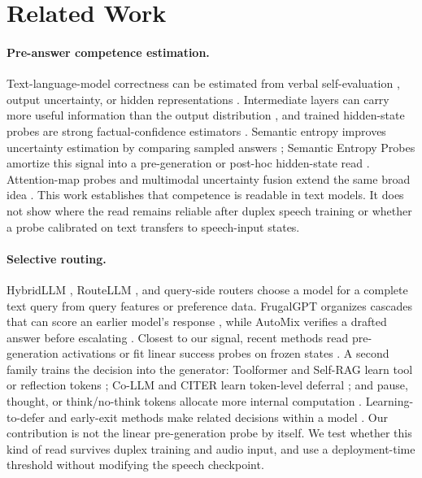 \section{Related Work}
\label{sec:related}

\paragraph{Pre-answer competence estimation.}
Text-language-model correctness can be estimated from verbal
self-evaluation \citep{kadavath2022language,lin2022teaching}, output
uncertainty, or hidden representations
\citep{azaria2023internal,burns2023discovering,marks2024geometry}.
Intermediate layers can carry more useful information than the output
distribution \citep{orgad2024llms}, and trained hidden-state probes are
strong factual-confidence estimators \citep{mahaut2024factual}.
Semantic entropy improves uncertainty estimation by comparing sampled
answers \citep{kuhn2023semantic,farquhar2024detecting}; Semantic
Entropy Probes amortize this signal into a pre-generation or post-hoc
hidden-state read \citep{kossen2024semantic}. Attention-map probes and
multimodal uncertainty fusion extend the same broad idea
\citep{chuang2024lookback,umui2026}. This work establishes that
competence is readable in text models. It does not show where the read
remains reliable after duplex speech training or whether a probe
calibrated on text transfers to speech-input states.

\paragraph{Selective routing.}
HybridLLM \citep{ding2024hybrid}, RouteLLM
\citep{ong2024routellm}, and query-side routers
\citep{hybridserve2025,hu2024routerbench,llmrouterbench2026} choose a
model for a complete text query from query features or preference
data. FrugalGPT organizes cascades that can score an earlier model's
response \citep{chen2023frugalgpt}, while AutoMix verifies a drafted
answer before escalating \citep{aggarwal2024automix}. Closest to our
signal, recent methods read pre-generation activations or fit linear
success probes on frozen states
\citep{varshney2026llmrouter,lugoloobi2025difficulty,
lugoloobi2026failures}. A second family trains the decision into the
generator: Toolformer and Self-RAG learn tool or reflection tokens
\citep{schick2023toolformer,asai2024selfrag}; Co-LLM and CITER learn
token-level deferral \citep{shen2024collaborative,zheng2025citer}; and
pause, thought, or think/no-think tokens allocate more internal
computation
\citep{goyal2024pause,zelikman2024quietstar,yang2025qwen3,
guo2025deepseekr1}. Learning-to-defer and early-exit methods make
related decisions within a model
\citep{madras2018predict,schuster2022confident}. Our contribution is
not the linear pre-generation probe by itself. We test whether this
kind of read survives duplex training and audio input, and use a
deployment-time threshold without modifying the speech checkpoint.

